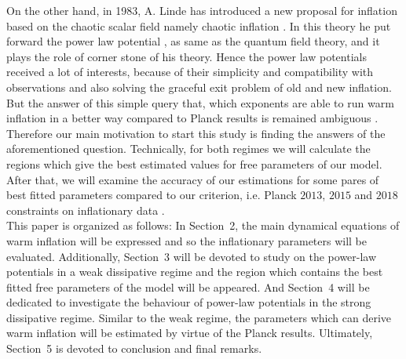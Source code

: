 \documentclass[12pt]{revtex4}
\begin{document}
On the other hand, in 1983, A. Linde has introduced a new proposal for inflation based on the chaotic scalar field namely chaotic inflation \cite{Lin83}. In this theory he put { forward} the power law potential , as same as  {the }quantum field theory, and it plays the role of  corner stone of his theory. Hence the power law {potentials received a lot of interests}, because of their simplicity and compatibility with observations and also solving the graceful exit problem of old and new inflation. But the answer of this simple query that{,} which exponents are able to run warm inflation in a better way compared to Planck results is remained  ambiguous  \cite{Lyth}. Therefore our main motivation to start this study {is} finding the answers of the aforementioned question. Technically, for both regimes we will calculate the regions which give the best estimated values for free parameters of our model.  After that, we will examine the accuracy of our estimations for some pares of best fitted parameters compared to our criterion, {i.e. } Planck $2013$, $2015$ and {$2018$ } constraints on inflationary data \cite{Ade:2013ktc,Ade:2013uln,Ade:2013ydc,Planck2015,Planck2018}.\\
This paper is organized as follows:
 In Section~2, the main dynamical equations of warm inflation will be expressed and so the inflationary parameters will be evaluated. Additionally, Section~3 will be devoted to study on the power-law potentials in a weak dissipative regime and the region which contains the best fitted free parameters of the model will be appeared.  And Section~4 will be dedicated to investigate the behaviour of power-law  potentials in the strong dissipative regime. Similar to  the weak regime,  the parameters which can derive warm inflation will be estimated by virtue of  the Planck results. Ultimately, Section~5 is devoted to conclusion and final remarks.


\end{document}
